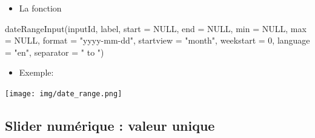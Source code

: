 \documentclass[
]{article}
\newenvironment{Shaded}{\begin{snugshade}}{\end{snugshade}}
\newcommand{\AttributeTok}[1]{\textcolor[rgb]{0.77,0.63,0.00}{#1}}
\newcommand{\CommentTok}[1]{\textcolor[rgb]{0.56,0.35,0.01}{\textit{#1}}}
\newcommand{\ConstantTok}[1]{\textcolor[rgb]{0.00,0.00,0.00}{#1}}
\newcommand{\DecValTok}[1]{\textcolor[rgb]{0.00,0.00,0.81}{#1}}
\newcommand{\FunctionTok}[1]{\textcolor[rgb]{0.00,0.00,0.00}{#1}}
\newcommand{\NormalTok}[1]{#1}
\newcommand{\StringTok}[1]{\textcolor[rgb]{0.31,0.60,0.02}{#1}}
\providecommand{\tightlist}{%
  \setlength{\itemsep}{0pt}\setlength{\parskip}{0pt}}
\begin{document}
\begin{itemize}
\tightlist
\item
  La fonction
\end{itemize}

\begin{Shaded}
\begin{Highlighting}[]
\FunctionTok{dateRangeInput}\NormalTok{(inputId, label, }\AttributeTok{start =} \ConstantTok{NULL}\NormalTok{, }\AttributeTok{end =} \ConstantTok{NULL}\NormalTok{, }\AttributeTok{min =} \ConstantTok{NULL}\NormalTok{, }\AttributeTok{max =} \ConstantTok{NULL}\NormalTok{,}
               \AttributeTok{format =} \StringTok{"yyyy{-}mm{-}dd"}\NormalTok{, }\AttributeTok{startview =} \StringTok{"month"}\NormalTok{, }\AttributeTok{weekstart =} \DecValTok{0}\NormalTok{,}
               \AttributeTok{language =} \StringTok{"en"}\NormalTok{, }\AttributeTok{separator =} \StringTok{" to "}\NormalTok{)}
\end{Highlighting}
\end{Shaded}

\begin{itemize}
\tightlist
\item
  Exemple:
\end{itemize}

\begin{Shaded}
\end{Shaded}

\texttt{[image: img/date\_range.png]}

\hypertarget{slider-numuxe9rique-valeur-unique}{%
\subsection{Slider numérique : valeur
unique}\label{slider-numuxe9rique-valeur-unique}}
\end{document}
